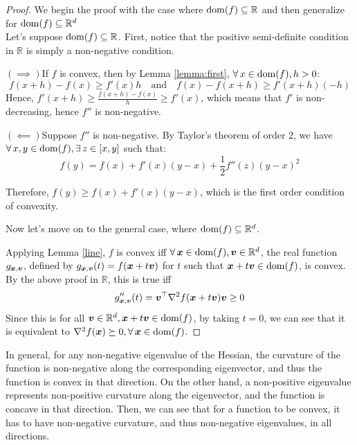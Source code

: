 \documentclass{article}
\newcommand{\R}{\mathbb{R}}
\begin{document}
\begin{proof}\cite{hall2016}
We begin the proof with the case where $\dom(f)\subseteq\R$ and then generalize for $\dom(f)\subseteq\R^d$\\

Let's suppose $\dom(f)\subseteq\R$. First, notice that the positive semi-definite condition in $\R$ is simply a non-negative condition.

$(\implies)$\quad If $f$ is convex, then by Lemma \ref{lemma:first}, $\forall x\in\dom(f), h>0$:
\[
    f(x+h)-f(x)\geq f'(x)h \quad \text{and}\quad f(x)-f(x+h) \geq f'(x+h)(-h)
\]
Hence, $f'(x+h)\geq \frac{f(x+h)-f(x)}{h}\geq f'(x)$, which means that $f'$ is non-decreasing, hence $f''$ is non-negative.

$(\impliedby)$\quad Suppose $f''$ is non-negative. By Taylor's theorem of order 2, we have $\forall x,y \in \dom(f), \exists z\in [x,y]$ such that:
\[
    f(y)=f(x)+f'(x)(y-x)+\frac{1}{2}f''(z)(y-x)^2
\]

Therefore, $f(y)\geq f(x)+f'(x)(y-x)$, which is the first order condition of convexity.

Now let's move on to the general case, where $\dom(f)\subseteq\R^d$.

Applying Lemma \ref{line}, $f$ is convex iff $\forall \vx \in \dom(f), \vv \in \R^d$, the real function $g_{{\bm{x}},{\bm{v}}}$, defined by $g_{{\bm{x}},{\bm{v}}}(t) = f({\bm{x}}+t{\bm{v}})$ for $t$ such that ${\bm{x}}+t{\bm{v}} \in \operatorname{dom}(f)$, is convex.
By the above proof in $\R$, this is true iff
\[
    g_{{\bm{x}},{\bm{v}}}''(t) = {\bm{v}}^\top \nabla^2 f({\bm{x}}+t{\bm{v}}) {\bm{v}} \geq 0
\]
Since this is for all $\vv \in \R^d, \vx+t\vv \in \dom(f)$, by taking $t=0$, we can see that it is equivalent to $\nabla^2 f(\vx)\succeq 0, \forall \vx \in \dom(f)$.
\end{proof}{}

In general, for any non-negative eigenvalue of the Hessian, the curvature of the function is non-negative along the corresponding eigenvector, and thus the function is convex in that direction. 
On the other hand, a non-positive eigenvalue represents non-positive curvature along the eigenvector, and the function is concave in that direction. 
Then, we can see that for a function to be convex, it has to have non-negative curvature, and thus non-negative eigenvalues, in all directions.
\end{document}
